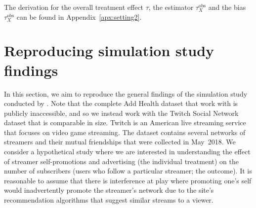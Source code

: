 \documentclass[10pt]{article}
\begin{document}
The derivation for the overall treatment effect $\tau$, the estimator $\tau_{X}^\text{obs}$ and the bias $\tau_{X}^\text{obs}$ can be found in Appendix~\ref{apx:setting2}.

\section{Reproducing simulation study findings} \label{sec:simulation}

In this section, we aim to reproduce the general findings of the simulation study conducted by \textcite{Forastiere:2021}. Note that the complete Add Health dataset that \citeauthor{Forastiere:2021} work with is publicly inaccessible, and so we instead work with the Twitch Social Network dataset \parencite{Rozemberczki:2021} that is comparable in size. Twitch is an American live streaming service that focuses on video game streaming. The dataset contains several networks of streamers and their mutual friendships that were collected in May~2018. We consider a hypothetical study where we are interested in understanding the effect of streamer self-promotions and advertising (the individual treatment) on the number of subscribers (users who follow a particular streamer; the outcome). It is reasonable to assume that there is interference at play where promoting one's self would inadvertently promote the streamer's network due to the site's recommendation algorithms that suggest similar streams to a viewer.
\\
\end{document}

